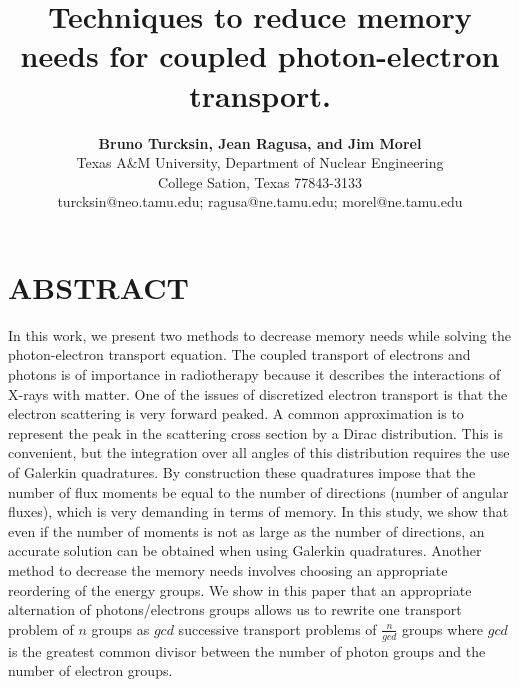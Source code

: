 \documentclass[11pt,letter,twoside]{mc2011}
\begin{document}
\title{Techniques to reduce memory needs for coupled photon-electron transport.}

\author{
    \textbf{Bruno Turcksin, Jean Ragusa, and Jim Morel}\\
    Texas A\&M University, Department of Nuclear Engineering\\
    College Sation, Texas 77843-3133\\
    turcksin@neo.tamu.edu; ragusa@ne.tamu.edu; morel@ne.tamu.edu
}

\maketitle

\thispagestyle{empty}

\section*{ABSTRACT}

\small
 In this work, we present two methods to decrease memory needs while solving 
the photon-electron transport equation. The coupled transport of electrons and
photons is of importance in radiotherapy because it describes the interactions of
X-rays with matter. One of the issues of discretized electron transport is that the
electron scattering is very forward peaked. A common approximation is to
represent the peak in the scattering cross section by a Dirac distribution.
This is convenient, but the integration over all angles of this distribution requires the
use of Galerkin quadratures. By construction these quadratures impose that
the number of flux moments be equal to the number of directions 
(number of angular fluxes), which is very demanding in terms of memory. In this study, 
we show that even if the number of moments is not as large as the number 
of directions, an accurate solution can be obtained when using Galerkin
quadratures. Another method to decrease the 
memory needs involves choosing an appropriate reordering of the energy
groups. 
We show in this paper that an appropriate alternation of photons/electrons groups 
allows us to rewrite one transport problem of $n$ groups as $gcd$ successive 
transport problems of $\frac{n}{gcd}$ groups where $gcd$ is the greatest common 
divisor between the number of photon groups and the number of electron groups.
\end{document}
